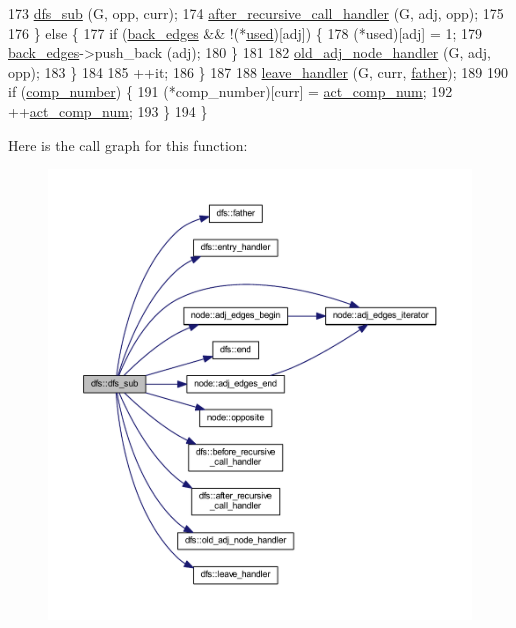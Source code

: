 \begin{DoxyCode}
173         \mbox{\hyperlink{classdfs_ad10b710339b289a61723aef52fbcb5b4}{dfs\_sub}} (G, opp, curr);
174         \mbox{\hyperlink{classdfs_a92fdca8a77b55d08b129aeab4fc66e4c}{after\_recursive\_call\_handler}} (G, adj, opp);
175 
176     \} \textcolor{keywordflow}{else} \{
177         \textcolor{keywordflow}{if} (\mbox{\hyperlink{classdfs_a1dc18a7df8d6b238d5301c92fc7540fa}{back\_edges}} && !(*\mbox{\hyperlink{classdfs_afc18288747491be301d6d8d85d8f220b}{used}})[adj]) \{
178         (*used)[adj] = 1;
179         \mbox{\hyperlink{classdfs_a1dc18a7df8d6b238d5301c92fc7540fa}{back\_edges}}->push\_back (adj);
180         \}
181 
182         \mbox{\hyperlink{classdfs_a33d1d2caa38dd038e03fa4041f5b9521}{old\_adj\_node\_handler}} (G, adj, opp);
183     \}
184 
185     ++it;
186     \}
187 
188     \mbox{\hyperlink{classdfs_abfe33292cd567f22596ba0c313481582}{leave\_handler}} (G, curr, \mbox{\hyperlink{classdfs_a3012717ce541b3e56943e2c2c50efdf6}{father}});
189 
190     \textcolor{keywordflow}{if} (\mbox{\hyperlink{classdfs_a00db016ac7eab69045cae408008890c1}{comp\_number}}) \{
191     (*comp\_number)[curr] = \mbox{\hyperlink{classdfs_ab0251ac30adfd569e214a64db7f3a905}{act\_comp\_num}};
192     ++\mbox{\hyperlink{classdfs_ab0251ac30adfd569e214a64db7f3a905}{act\_comp\_num}};
193     \}
194 \}
\end{DoxyCode}
Here is the call graph for this function\+:\nopagebreak
\begin{figure}[H]
\begin{center}
\leavevmode
\includegraphics[width=350pt]{classdfs_ad10b710339b289a61723aef52fbcb5b4_cgraph}
\end{center}
\end{figure}
